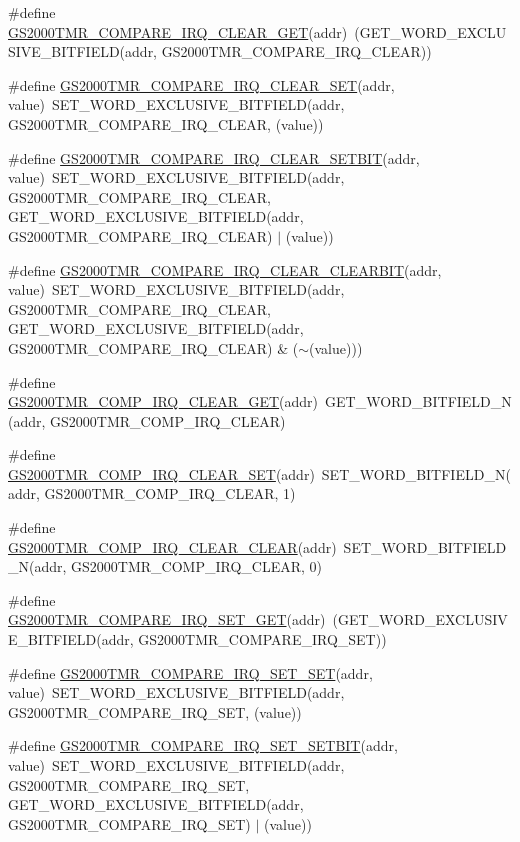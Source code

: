 \begin{DoxyCompactItemize}
\item 
\#define \hyperlink{a00555_a235c4b15015a5e1e15b9cf0c674139df}{GS2000TMR\_\-COMPARE\_\-IRQ\_\-CLEAR\_\-GET}(addr)~(GET\_\-WORD\_\-EXCLUSIVE\_\-BITFIELD(addr, GS2000TMR\_\-COMPARE\_\-IRQ\_\-CLEAR))
\item 
\#define \hyperlink{a00555_ac0c6b40905e1d329ff2cd86551a37bd1}{GS2000TMR\_\-COMPARE\_\-IRQ\_\-CLEAR\_\-SET}(addr, value)~SET\_\-WORD\_\-EXCLUSIVE\_\-BITFIELD(addr, GS2000TMR\_\-COMPARE\_\-IRQ\_\-CLEAR, (value))
\item 
\#define \hyperlink{a00555_a9567b78e454e6e6eda9d5e839783af56}{GS2000TMR\_\-COMPARE\_\-IRQ\_\-CLEAR\_\-SETBIT}(addr, value)~SET\_\-WORD\_\-EXCLUSIVE\_\-BITFIELD(addr, GS2000TMR\_\-COMPARE\_\-IRQ\_\-CLEAR, GET\_\-WORD\_\-EXCLUSIVE\_\-BITFIELD(addr, GS2000TMR\_\-COMPARE\_\-IRQ\_\-CLEAR) $|$ (value))
\item 
\#define \hyperlink{a00555_a83537c4231504b49555364d32f615f3a}{GS2000TMR\_\-COMPARE\_\-IRQ\_\-CLEAR\_\-CLEARBIT}(addr, value)~SET\_\-WORD\_\-EXCLUSIVE\_\-BITFIELD(addr, GS2000TMR\_\-COMPARE\_\-IRQ\_\-CLEAR, GET\_\-WORD\_\-EXCLUSIVE\_\-BITFIELD(addr, GS2000TMR\_\-COMPARE\_\-IRQ\_\-CLEAR) \& ($\sim$(value)))
\item 
\#define \hyperlink{a00555_aead3b1f61dfef8d726570badedaa1855}{GS2000TMR\_\-COMP\_\-IRQ\_\-CLEAR\_\-GET}(addr)~GET\_\-WORD\_\-BITFIELD\_\-N(addr, GS2000TMR\_\-COMP\_\-IRQ\_\-CLEAR)
\item 
\#define \hyperlink{a00555_ab513e7349b1133860284eb30e889d755}{GS2000TMR\_\-COMP\_\-IRQ\_\-CLEAR\_\-SET}(addr)~SET\_\-WORD\_\-BITFIELD\_\-N(addr, GS2000TMR\_\-COMP\_\-IRQ\_\-CLEAR, 1)
\item 
\#define \hyperlink{a00555_a05411eca54bddca6b7f65b78d8171d0f}{GS2000TMR\_\-COMP\_\-IRQ\_\-CLEAR\_\-CLEAR}(addr)~SET\_\-WORD\_\-BITFIELD\_\-N(addr, GS2000TMR\_\-COMP\_\-IRQ\_\-CLEAR, 0)
\item 
\#define \hyperlink{a00555_a915faf9c4f44ffdd339be938aa87f842}{GS2000TMR\_\-COMPARE\_\-IRQ\_\-SET\_\-GET}(addr)~(GET\_\-WORD\_\-EXCLUSIVE\_\-BITFIELD(addr, GS2000TMR\_\-COMPARE\_\-IRQ\_\-SET))
\item 
\#define \hyperlink{a00555_ab2b848551ab4ac428be3f1e4b3836953}{GS2000TMR\_\-COMPARE\_\-IRQ\_\-SET\_\-SET}(addr, value)~SET\_\-WORD\_\-EXCLUSIVE\_\-BITFIELD(addr, GS2000TMR\_\-COMPARE\_\-IRQ\_\-SET, (value))
\item 
\#define \hyperlink{a00555_ac869201b2a5270568c6a18ca325dbc39}{GS2000TMR\_\-COMPARE\_\-IRQ\_\-SET\_\-SETBIT}(addr, value)~SET\_\-WORD\_\-EXCLUSIVE\_\-BITFIELD(addr, GS2000TMR\_\-COMPARE\_\-IRQ\_\-SET, GET\_\-WORD\_\-EXCLUSIVE\_\-BITFIELD(addr, GS2000TMR\_\-COMPARE\_\-IRQ\_\-SET) $|$ (value))

\end{DoxyCompactItemize}
